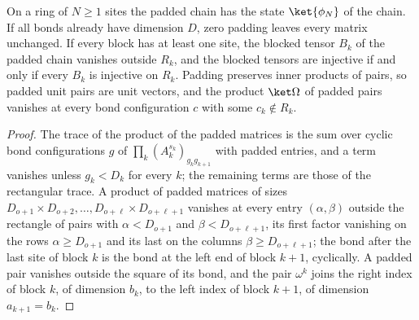 \begin{lemma}
    \label{thm:ldp_zero_pad}
    \leanok
    On a ring of $N\ge1$ sites the padded chain has the state $\ket{\phi_N}$ of
    the chain. If all bonds already have dimension $D$, zero padding leaves
    every matrix unchanged. If every block has at least one site, the blocked tensor $B_k$
    of the padded chain vanishes outside $R_k$, and the blocked tensors
    are injective if and only if every $B_k$ is injective on $R_k$. Padding preserves inner
    products of pairs, so padded unit pairs are unit vectors, and the product
    $\ket\Omega$ of padded pairs vanishes at every bond configuration $c$ with
    some $c_k\notin R_k$.
\end{lemma}
\begin{proof}
    \leanok
    The trace of the product of the padded matrices is the sum over cyclic bond
    configurations $g$ of $\prod_k(A_k^{s_k})_{g_kg_{k+1}}$ with padded entries,
    and a term vanishes unless $g_k<D_k$ for every $k$; the remaining terms are
    those of the rectangular trace. A product of padded matrices of sizes
    $D_{o+1}\times D_{o+2},\dots,D_{o+\ell}\times D_{o+\ell+1}$ vanishes at
    every entry $(\alpha,\beta)$ outside the rectangle of pairs with
    $\alpha<D_{o+1}$ and $\beta<D_{o+\ell+1}$, its first factor vanishing on the
    rows $\alpha\ge D_{o+1}$ and its last on the columns
    $\beta\ge D_{o+\ell+1}$; the bond after the last site of block $k$ is the
    bond at the left end of block $k+1$, cyclically. A padded pair vanishes
    outside the square of its bond, and the pair $\omega^k$ joins the right
    index of block $k$, of dimension $b_k$, to the left index of block $k+1$,
    of dimension $a_{k+1}=b_k$.
\end{proof}

